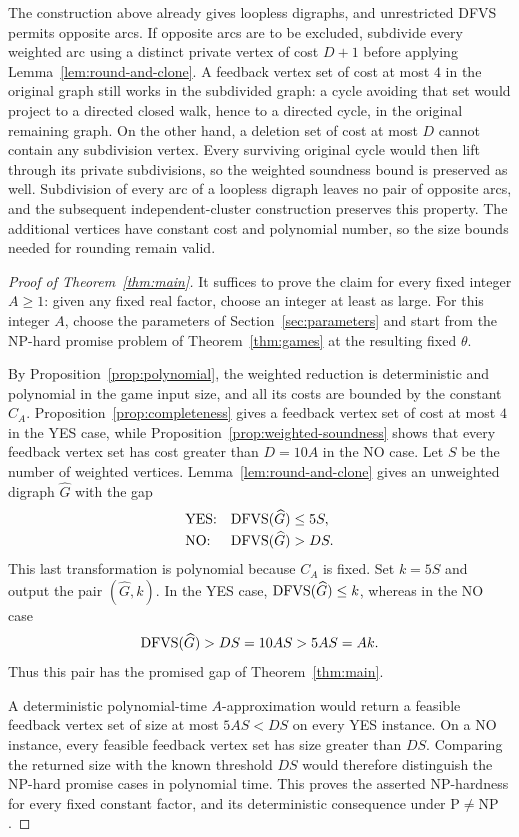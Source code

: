 \begin{remark}
\label{rem:no-opposite-arcs}
The construction above already gives loopless digraphs, and unrestricted
DFVS permits opposite arcs.  If opposite arcs are to be excluded, subdivide
every weighted arc using a distinct private vertex of cost $D+1$ before
applying Lemma~\ref{lem:round-and-clone}.  A feedback vertex set of cost at
most $4$ in the original graph still works in the subdivided graph: a
cycle avoiding that set would project to a directed closed walk, hence
to a directed cycle, in the original remaining graph.  On the other hand,
a deletion set of cost at most $D$ cannot contain any subdivision vertex.
Every surviving original cycle would then lift through its private
subdivisions, so the weighted soundness bound is preserved as well.
Subdivision of every arc of a loopless digraph leaves no pair of opposite
arcs, and the subsequent independent-cluster construction preserves this
property.  The additional vertices have constant cost and polynomial
number, so the size bounds needed for rounding remain valid.
\end{remark}

\begin{proof}[Proof of Theorem~\ref{thm:main}]
It suffices to prove the claim for every fixed integer $A\ge1$: given any
fixed real factor, choose an integer at least as large.  For this integer
$A$, choose the parameters of Section~\ref{sec:parameters} and start from
the NP-hard promise problem of Theorem~\ref{thm:games} at the resulting
fixed $\theta$.

By Proposition~\ref{prop:polynomial}, the weighted reduction is
deterministic and polynomial in the game input size, and all its costs are
bounded by the constant $C_A$.  Proposition~\ref{prop:completeness} gives
a feedback vertex set of cost at most $4$ in the YES case, while
Proposition~\ref{prop:weighted-soundness} shows that every feedback vertex
set has cost greater than $D=10A$ in the NO case.  Let $S$ be the number of
weighted vertices.  Lemma~\ref{lem:round-and-clone} gives an unweighted
digraph $\widehat G$ with the gap
\[
  \begin{array}{ll}
    \text{YES:}&\operatorname{DFVS}(\widehat G)\le5S,\\[2pt]
    \text{NO:}&\operatorname{DFVS}(\widehat G)>DS.
  \end{array}
\]
This last transformation is polynomial because $C_A$ is fixed.  Set
$k=5S$ and output the pair $(\widehat G,k)$.  In the YES case,
$\operatorname{DFVS}(\widehat G)\le k$, whereas in the NO case
\[
  \operatorname{DFVS}(\widehat G)>DS=10AS>5AS=Ak.
\]
Thus this pair has the promised gap of Theorem~\ref{thm:main}.

A deterministic polynomial-time $A$-approximation would return a feasible
feedback vertex set of size at most $5AS<DS$ on every YES instance.  On a
NO instance, every feasible feedback vertex set has size greater than
$DS$.  Comparing the returned size with the known threshold $DS$ would
therefore distinguish the NP-hard promise cases in polynomial time.
This proves the asserted NP-hardness for every fixed constant factor,
and its deterministic consequence under $\mathrm P\ne\mathrm{NP}$.
\end{proof}


